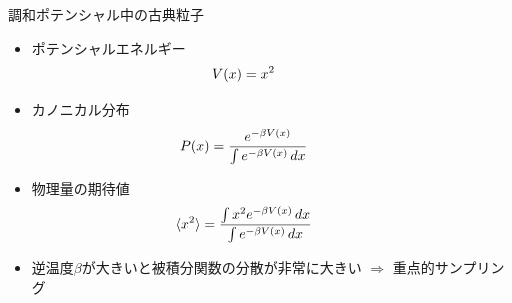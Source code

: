 
\begin{frame}[t,fragile]{調和ポテンシャル中の古典粒子}
  \begin{itemize}
  \item ポテンシャルエネルギー
    \[ \hspace*{-4em} V(x) = x^2 \]
  \item カノニカル分布
    \[ \hspace*{-4em} P(x) = \frac{e^{-\beta V(x)}}{\int e^{-\beta V(x)} \, dx} \]
  \item 物理量の期待値
    \[ \hspace*{-4em} \langle x^2 \rangle = \frac{\int x^2 e^{-\beta V(x)} \, dx}{\int e^{-\beta V(x)} \, dx} \]
  \item 逆温度$\beta$が大きいと被積分関数の分散が非常に大きい $\Rightarrow$ 重点的サンプリング
  \end{itemize}
  \vspace*{-15em} \hfill
\end{frame}
